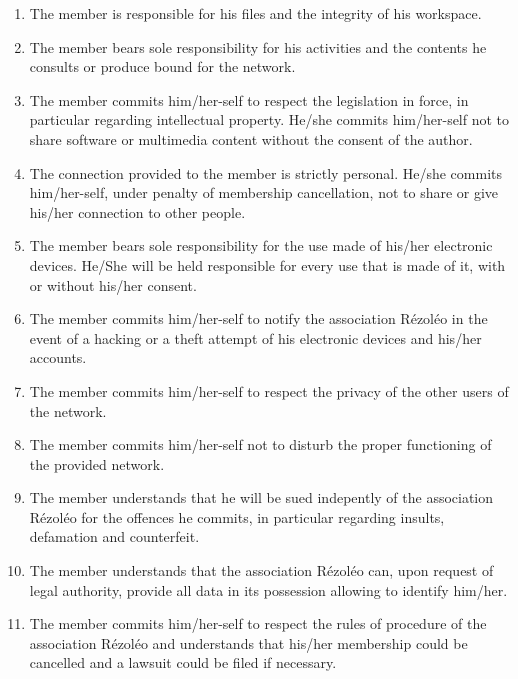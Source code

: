 \documentclass[12pt]{article}
\begin{document}
\begin{enumerate}
\item The member is responsible for his files and the integrity of his workspace.

\item The member bears sole responsibility for his activities and the contents he consults or produce bound for the network.

\item The member commits him/her-self to respect the legislation in force, in particular regarding intellectual property. He/she commits him/her-self not to share software or multimedia content without the consent of the author.

\item The connection provided to the member is strictly personal. He/she commits him/her-self, under penalty of membership cancellation, not to share or give his/her connection to other people.

\item The member bears sole responsibility for the use made of his/her electronic devices. He/She will be held responsible for every use that is made of it, with or without his/her consent.

\item The member commits him/her-self to notify the association Rézoléo in the event of a hacking or a theft attempt of his electronic devices and his/her accounts.

\item The member commits him/her-self to respect the privacy of the other users of the network.

\item The member commits him/her-self not to disturb the proper functioning of the provided network.

\item The member understands that he will be sued indepently of the association Rézoléo for the offences he commits, in particular regarding insults, defamation and counterfeit.

\item The member understands that the association Rézoléo can, upon request of legal authority, provide all data in its possession allowing to identify him/her.

\item The member commits him/her-self to respect the rules of procedure of the association Rézoléo and understands that his/her membership could be cancelled and a lawsuit could be filed if necessary.

%

\end{enumerate}
\end{document}
